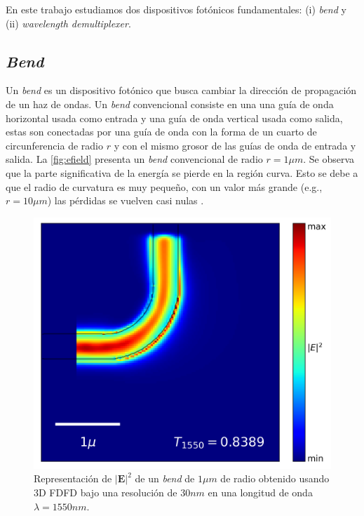 En este trabajo estudiamos dos dispositivos fotónicos fundamentales:
(i) \emph{bend} y (ii) \emph{wavelength demultiplexer}.

\subsection{\emph{Bend}}

Un \emph{bend} es un dispositivo fotónico que busca cambiar la dirección de propagación de un haz de ondas.
Un \emph{bend} convencional consiste en una una guía de onda horizontal usada como entrada y
una guía de onda vertical usada como salida, estas son conectadas por una guía de onda con la forma de un
cuarto de circunferencia de radio $r$ y con el mismo grosor de las guías de onda de entrada y salida. La \autoref{fig:efield} presenta un \emph{bend} convencional de radio $r = 1 \mu m$. Se observa que la parte significativa de la energía se pierde en la región curva.
Esto se debe a que el radio de curvatura es muy pequeño, con un valor más grande (e.g., $r = 10 \mu m$) 
las pérdidas se vuelven casi nulas \citep{LukasChrostowski2010}.

\begin{figure}[ht]
  \centering
  \includegraphics[scale=0.7]{image/theory/bend_field_dx30_px16_rint1000.png}
   \caption{Representación de $|\boldsymbol{E}|^2$ de un \emph{bend} de $1 \mu m$ de radio obtenido usando 3D FDFD bajo una resolución de $30 nm$ en una longitud de onda $\lambda = 1550 nm$.}
  \label{fig:efield}
\end{figure}

